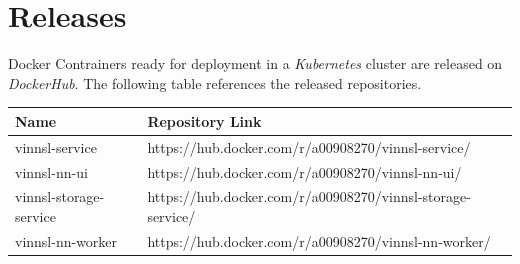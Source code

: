 \section{Releases}\label{releases}

Docker Contrainers ready for deployment in a \emph{Kubernetes} cluster
are released on \emph{DockerHub}. The following table references the
released repositories.

\begin{longtable}[]{@{}ll@{}}
\toprule
\begin{minipage}[b]{0.26\columnwidth}\raggedright\strut
Name\strut
\end{minipage} & \begin{minipage}[b]{0.68\columnwidth}\raggedright\strut
Repository Link\strut
\end{minipage}\tabularnewline
\midrule
\endhead
\begin{minipage}[t]{0.26\columnwidth}\raggedright\strut
vinnsl-service\strut
\end{minipage} & \begin{minipage}[t]{0.68\columnwidth}\raggedright\strut
https://hub.docker.com/r/a00908270/vinnsl-service/\strut
\end{minipage}\tabularnewline
\begin{minipage}[t]{0.26\columnwidth}\raggedright\strut
vinnsl-nn-ui\strut
\end{minipage} & \begin{minipage}[t]{0.68\columnwidth}\raggedright\strut
https://hub.docker.com/r/a00908270/vinnsl-nn-ui/\strut
\end{minipage}\tabularnewline
\begin{minipage}[t]{0.26\columnwidth}\raggedright\strut
vinnsl-storage-service\strut
\end{minipage} & \begin{minipage}[t]{0.68\columnwidth}\raggedright\strut
https://hub.docker.com/r/a00908270/vinnsl-storage-service/\strut
\end{minipage}\tabularnewline
\begin{minipage}[t]{0.26\columnwidth}\raggedright\strut
vinnsl-nn-worker\strut
\end{minipage} & \begin{minipage}[t]{0.68\columnwidth}\raggedright\strut
https://hub.docker.com/r/a00908270/vinnsl-nn-worker/\strut
\end{minipage}\tabularnewline
\bottomrule
\end{longtable}

